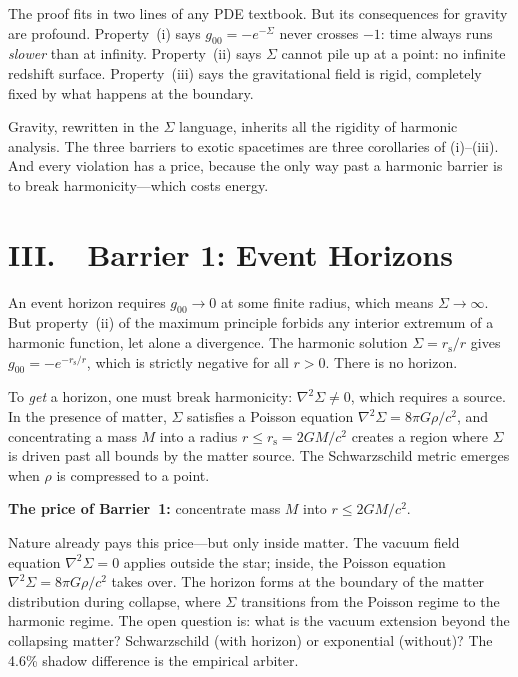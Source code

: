 \documentclass[12pt]{article}
\newcommand{\rs}{r_{\mathrm{s}}}
\begin{document}
The proof fits in two lines of any PDE textbook. But its consequences
for gravity are profound. Property~(i) says $g_{00} = -e^{-\Sigma}$
never crosses $-1$: time always runs \emph{slower} than at infinity.
Property~(ii) says $\Sigma$ cannot pile up at a point: no infinite
redshift surface. Property~(iii) says the gravitational field is rigid,
completely fixed by what happens at the boundary.

Gravity, rewritten in the $\Sigma$ language, inherits all the rigidity
of harmonic analysis. The three barriers to exotic spacetimes are three
corollaries of (i)--(iii). And every violation has a price, because the
only way past a harmonic barrier is to break harmonicity---which costs
energy.


\section*{III.\ \ Barrier 1: Event Horizons}

An event horizon requires $g_{00} \to 0$ at some finite radius, which
means $\Sigma \to \infty$. But property~(ii) of the maximum principle
forbids any interior extremum of a harmonic function, let alone a
divergence. The harmonic solution $\Sigma = \rs/r$ gives
$g_{00} = -e^{-\rs/r}$, which is strictly negative for all $r > 0$.
There is no horizon.

To \emph{get} a horizon, one must break harmonicity:
$\nabla^2\Sigma \neq 0$, which requires a source. In the presence of
matter, $\Sigma$ satisfies a Poisson equation
$\nabla^2\Sigma = 8\pi G\rho/c^2$, and concentrating a mass $M$ into a
radius $r \leq \rs = 2GM/c^2$ creates a region where $\Sigma$ is driven
past all bounds by the matter source. The Schwarzschild metric emerges
when $\rho$ is compressed to a point.




\noindent\textbf{The price of Barrier~1:} concentrate mass $M$ into
$r \leq 2GM/c^2$.



Nature already pays this price---but only inside matter.
The vacuum field equation $\nabla^2\Sigma = 0$ applies outside
the star; inside, the Poisson equation $\nabla^2\Sigma = 8\pi G\rho/c^2$
takes over. The horizon forms at the boundary of the matter
distribution during collapse, where $\Sigma$ transitions from the
Poisson regime to the harmonic regime.  The open question is:
what is the vacuum extension beyond the collapsing matter?
Schwarzschild (with horizon) or exponential (without)?
The 4.6\% shadow difference is the empirical arbiter.
\end{document}
